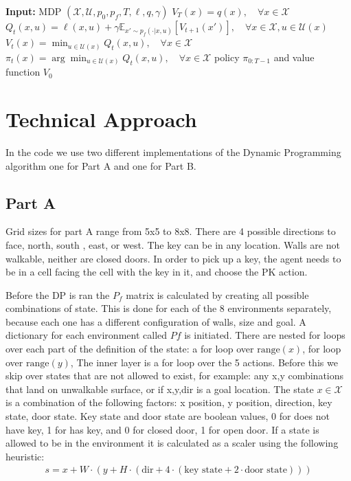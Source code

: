 \documentclass[conference]{IEEEtran}
\begin{document}
\begin{algorithm}
\caption{Dynamic Programming}
\begin{algorithmic}[1]
\STATE \textbf{Input:} MDP $(\mathcal{X}, \mathcal{U}, p_0, p_f, T, \ell, q, \gamma)$
\STATE $V_T(x) = q(x), \quad \forall x \in \mathcal{X}$
    \STATE $Q_t(x, u) = \ell(x, u) + \gamma \mathbb{E}_{x' \sim p_f(\cdot|x,u)}[V_{t+1}(x')], \quad \forall x \in \mathcal{X}, u \in \mathcal{U}(x)$
    \STATE $V_t(x) = \min_{u \in \mathcal{U}(x)} Q_t(x, u), \quad \forall x \in \mathcal{X}$
    \STATE $\pi_t(x) = \arg\min_{u \in \mathcal{U}(x)} Q_t(x, u), \quad \forall x \in \mathcal{X}$
\ENDFOR
\RETURN policy $\pi_{0:T-1}$ and value function $V_0$
\end{algorithmic}
\end{algorithm}


\section{Technical Approach}
In the code we use two different implementations of the Dynamic Programming algorithm one for Part A and one for Part B.

\subsection{Part A}
Grid sizes for part A range from 5x5 to 8x8. There are 4 possible directions to face, north, south , east, or west. The key can be in any location. Walls are not walkable, 
neither are closed doors.
In order to pick up a key, the agent needs to be in a cell facing the cell with the key in it, and choose the PK action.   

Before the DP is ran the $P_f$ matrix is calculated by creating all possible combinations of state. This is done for each of the 8 environments separately, because each one
has a different configuration of walls, size and goal.
A dictionary for each environment called $Pf$ is initiated. There are nested for loops over each part of the definition of the state:
a for loop over $\text{range}(x)$, for loop over $\text{range}(y)$, 
The inner layer is a for loop over the 5 actions. Before this we skip over states that are not allowed to exist, for example: any x,y combinations that land on unwalkable surface,
or if x,y,dir is a goal location. The state $x \in \mathcal{X}$ is a combination of the following factors: x position, y position, direction, key state, door state.
Key state and door state are boolean values, 0 for does not have key, 1 for has key, and 0 for closed door, 1 for open door. If a state is allowed to be in the environment 
it is calculated as a scaler using the following heuristic: 
\begin{align}
s = x + W \cdot (y + H \cdot (\text{dir} + 4 \cdot (\text{key state} + 2 \cdot \text{door state})))
\end{align}
\end{document}
